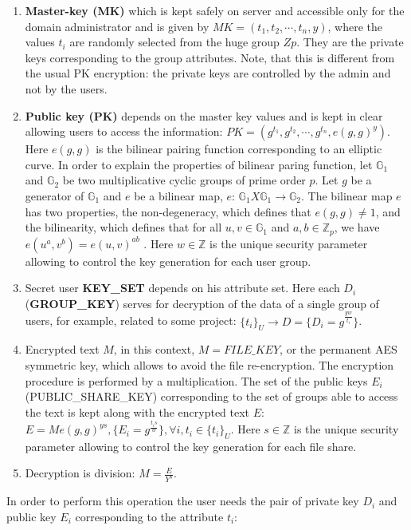 \documentclass[twocolumn]{svjour3}          	%
\begin{document}
\begin{enumerate}
	\item \textbf{Master-key (MK)} which is kept safely on server and accessible only for the domain administrator and is given by $MK = (t_1, t_2, \cdots ,t_n, y)$, where the values $t_i$ are randomly selected from the huge group $Zp$. They are the private keys corresponding to the group attributes. Note, that this is different from the usual PK encryption: the private keys are controlled by the admin and not by the users.
	\item \textbf{Public key (PK)} depends on the master key values and is kept in clear allowing users to access the information: $PK = (g^{t_1}, g^{t_2}, \cdots ,g^{t_n}, e(g,g)^y)$. Here $e(g,g)$ is the bilinear pairing function corresponding to an elliptic curve. In order to explain the properties of bilinear paring function, let $\mathbb{G}_1$ and $\mathbb{G}_2$ be two multiplicative cyclic groups of prime order $p$. Let $g$ be a generator of $\mathbb{G}_1$ and $e$ be a bilinear map, $e$: $\mathbb{G}_1 X \mathbb{G}_1 \rightarrow \mathbb{G}_2$. The bilinear map $e$ has two properties, the non-degeneracy, which defines that $e(g,g) \neq 1$, and the bilinearity, which defines that for all $u,v \in \mathbb{G}_1$ and $a,b \in \mathbb{Z}_p$, we have $e(u^a, v^b) = e(u,v)^{ab}$ \citep{goyal2006attribute}. Here $w \in \mathbb{Z}$ is the unique security parameter allowing to control the key generation for each user group.
	\item Secret user \textbf{KEY\_SET} depends on his attribute set. Here each $D_i$ (\textbf{GROUP\_KEY}) serves for decryption of the data of a single group of users, for example, related to some project: 	$\{t_i\}_U \rightarrow D = \{D_i = g^{\frac{yw}{t_i}}\}$.
	\item Encrypted text $M$, in this context, $M = FILE\_KEY$, or the permanent AES symmetric key, which allows to avoid the file re-encryption. The encryption procedure is performed by a multiplication. The set of the public keys $E_i$ (PUBLIC\_SHARE\_KEY) corresponding to the set of groups able to access the text is kept along with the encrypted text $E$: $E=Me(g,g)^{ys}, \{E_i = g^{\frac{t_is}{w}}\}, \forall i, t_i \in \{t_i\}_U$. Here $s \in \mathbb{Z}$ is the unique security parameter allowing to control the key generation for each file share.
	\item Decryption is division: $M = \frac{E}{Y^s}$. 
\end{enumerate}

In order to perform this operation the user needs the pair of private key $D_i$ and public key $E_i$ corresponding to the attribute $t_i$: 
\end{document}
